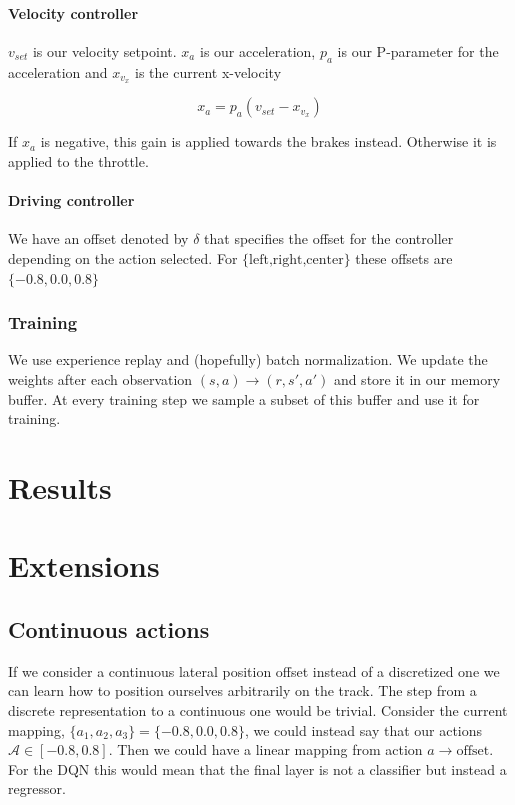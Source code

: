 \documentclass{article}
\begin{document}
\paragraph{Velocity controller}

$v_{set}$ is our velocity setpoint. $x_a$ is our acceleration, $p_a$ is our P-parameter for the acceleration and $x_{v_x}$ is the current x-velocity

\[
	x_a = p_a (v_{set} - x_{v_x})
\]

If $x_a$ is negative, this gain is applied towards the brakes instead. Otherwise it is applied to the throttle.

\paragraph{Driving controller}

We have an offset denoted by $\delta$ that specifies the offset for the controller depending on the action selected. For ${\text{\{left,right,center}\}}$ these offsets are $\{-0.8, 0.0, 0.8\}$

\subsubsection{Training}

We use experience replay and (hopefully) batch normalization. We update the weights after each observation $(s,a) \rightarrow (r,s',a')$ and store it in our memory buffer. At every training step we sample a subset of this buffer and use it for training.

\section{Results}

\section{Extensions}

\subsection{Continuous actions}

If we consider a continuous lateral position offset instead of a discretized one we can learn how to position ourselves arbitrarily on the track. The step from a discrete representation to a continuous one would be trivial. Consider the current mapping, $\{a_1,a_2,a_3\} = \{-0.8, 0.0, 0.8\}$, we could instead say that our actions $\mathcal{A} \in [-0.8,0.8]$. Then we could have a linear mapping from action $a \rightarrow \text{offset}$. For the DQN this would mean that the final layer is not a classifier but instead a regressor.
\end{document}
